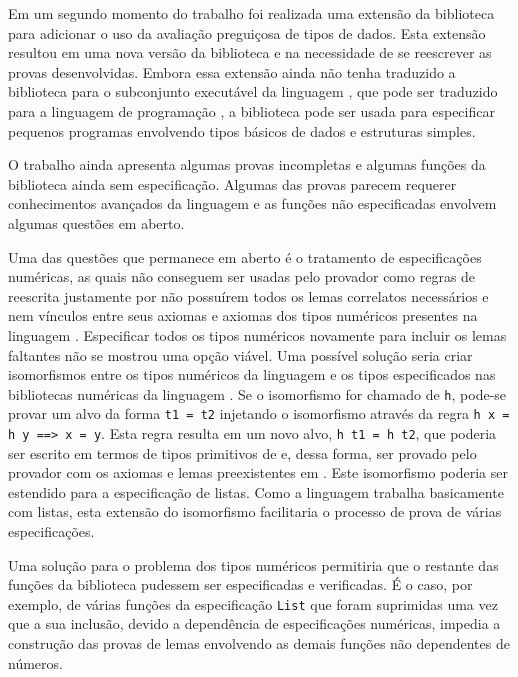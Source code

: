 Em um segundo momento do trabalho foi realizada uma extensão da biblioteca para adicionar o uso da avaliação preguiçosa de tipos de dados.
Esta extensão resultou em uma nova versão da biblioteca e na necessidade de se reescrever as provas desenvolvidas.
Embora essa extensão ainda não tenha traduzido a biblioteca para o subconjunto executável da linguagem \HasCASL, que pode ser traduzido para a linguagem de programação \Haskell, a biblioteca pode ser usada para especificar pequenos programas envolvendo tipos básicos de dados e estruturas simples.

O trabalho ainda apresenta algumas provas incompletas e algumas funções da biblioteca \Prelude ainda sem especificação.
Algumas das provas parecem requerer conhecimentos avançados da linguagem \HOL e as funções não especificadas envolvem algumas questões em aberto.

Uma das questões que permanece em aberto é o tratamento de especificações numéricas, as quais não conseguem ser usadas pelo provador \Isabelle como regras de reescrita justamente por não possuírem todos os lemas correlatos necessários e nem vínculos entre seus axiomas e axiomas dos tipos numéricos presentes na linguagem \HOL.
Especificar todos os tipos numéricos novamente para incluir os lemas faltantes não se mostrou uma opção viável.
Uma possível solução seria criar isomorfismos entre os tipos numéricos da linguagem \HOL e os tipos especificados nas bibliotecas numéricas da linguagem \CASL.
Se o isomorfismo for chamado de \Verb.h., pode-se provar um alvo da forma \Verb.t1 = t2. injetando o isomorfismo através da regra \Verb.h x = h y ==> x = y..
Esta regra resulta em um novo alvo, \Verb.h t1 = h t2., que poderia ser escrito em termos de tipos primitivos de \HOL e, dessa forma, ser provado pelo provador \Isabelle com os axiomas e lemas preexistentes em \HOL.
Este isomorfismo poderia ser estendido para a especificação de listas.
Como a linguagem \Haskell trabalha basicamente com listas, esta extensão do isomorfismo facilitaria o processo de prova de várias especificações.

Uma solução para o problema dos tipos numéricos permitiria que o restante das funções da biblioteca \Prelude pudessem ser especificadas e verificadas.
É o caso, por exemplo, de várias funções da especificação \Verb.List. que foram suprimidas uma vez que a sua inclusão, devido a dependência de especificações numéricas, impedia a construção das provas de lemas envolvendo as demais funções não dependentes de números.

